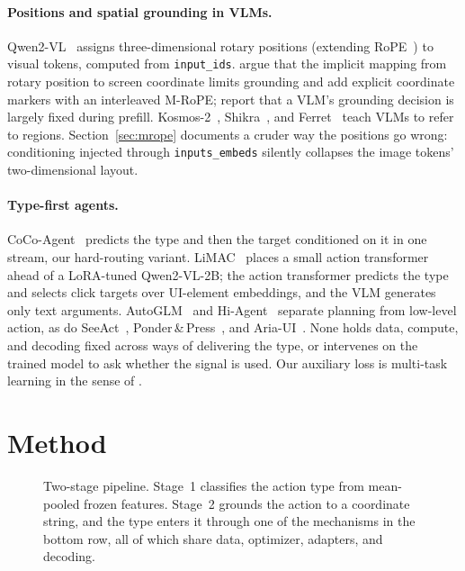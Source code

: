 \documentclass[letterpaper]{article} %
\begin{document}
\paragraph{Positions and spatial grounding in VLMs.}
Qwen2-VL~\citep{qwen2vl} assigns three-dimensional rotary positions (extending RoPE~\citep{roformer}) to visual tokens, computed from \texttt{input\_ids}. \citet{imrope} argue that the implicit mapping from rotary position to screen coordinate limits grounding and add explicit coordinate markers with an interleaved M-RoPE; \citet{prefill} report that a VLM's grounding decision is largely fixed during prefill. Kosmos-2~\citep{kosmos2}, Shikra~\citep{shikra}, and Ferret~\citep{ferret} teach VLMs to refer to regions. Section~\ref{sec:mrope} documents a cruder way the positions go wrong: conditioning injected through \texttt{inputs\_embeds} silently collapses the image tokens' two-dimensional layout.

\paragraph{Type-first agents.}
CoCo-Agent~\citep{cocoagent} predicts the type and then the target conditioned on it in one stream, our hard-routing variant. LiMAC~\citep{limac} places a small action transformer ahead of a LoRA-tuned Qwen2-VL-2B; the action transformer predicts the type and selects click targets over UI-element embeddings, and the VLM generates only text arguments. AutoGLM~\citep{autoglm} and Hi-Agent~\citep{hiagent} separate planning from low-level action, as do SeeAct~\citep{seeact}, Ponder\,\&\,Press~\citep{ponderpress}, and Aria-UI~\citep{ariaui}. None holds data, compute, and decoding fixed across ways of delivering the type, or intervenes on the trained model to ask whether the signal is used. Our auxiliary loss is multi-task learning in the sense of \citet{caruana}.

\section{Method}
\label{sec:method}

\begin{figure}[t]
  \centering
  \resizebox{0.86\textwidth}{!}{}
  \caption{Two-stage pipeline. Stage~1 classifies the action type from mean-pooled frozen features. Stage~2 grounds the action to a coordinate string, and the type enters it through one of the mechanisms in the bottom row, all of which share data, optimizer, adapters, and decoding.}
  \label{fig:arch}
\end{figure}
\end{document}
